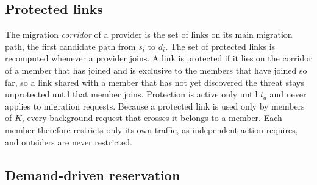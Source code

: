 \documentclass[11pt,a4paper]{article}
\theoremstyle{definition}
\begin{document}
\subsection{Protected links}

The migration \emph{corridor} of a provider is the set of links on its main migration path, the first candidate path from $s_i$ to $d_i$.
The set of protected links is recomputed whenever a provider joins. A link is protected if it lies on the corridor of a member that has joined and is exclusive to the members that have joined so far, so a link shared with a member that has not yet discovered the threat stays unprotected until that member joins.
Protection is active only until $t_d$ and never applies to migration requests.
Because a protected link is used only by members of $K$, every background request that crosses it belongs to a member.
Each member therefore restricts only its own traffic, as independent action requires, and outsiders are never restricted.

\subsection{Demand-driven reservation}
\end{document}
